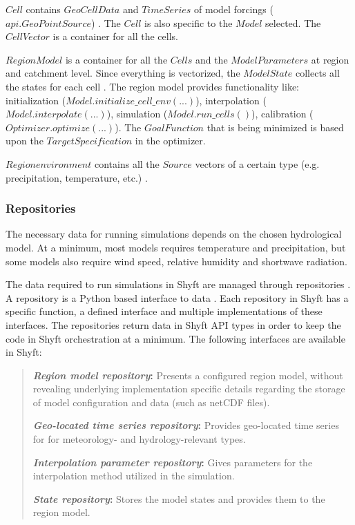$Cell$ contains $GeoCellData$ and $TimeSeries$ of model forcings ($api.GeoPointSource$) \autocite{burkhartShyftV4Framework2021}. The $Cell$ is also specific to the $Model$ selected. The $CellVector$ is a container for all the cells. 

$RegionModel$ is a container for all the $Cells$ and the $Model Parameters$ at region and catchment level. Since everything is vectorized, the $Model State$ collects all the states for each cell \autocite{burkhartShyftV4Framework2021}. The region model provides functionality like: initialization ($Model.initialize\_cell\_env(...)$), interpolation ($Model.interpolate(...)$), simulation ($Model.run\_cells()$), calibration ($Optimizer.optimize(...)$). The $GoalFunction$ that is being minimized is based upon the $TargetSpecification$ in the optimizer.

$Region environment$ contains all the $Source$ vectors of a certain type (e.g. precipitation, temperature, etc.) \autocite{burkhartShyftV4Framework2021}. 

\subsubsection{Repositories}

The necessary data for running simulations depends on the chosen hydrological model. At a minimum, most models requires temperature and precipitation, but some models also require wind speed, relative humidity and shortwave radiation. 

The data required to run simulations in Shyft are managed through repositories \autocite{fowlerPatternsEnterpriseApplication2003}. A repository is a Python based interface to data \autocite{masnunInterfacesPythonProtocols}. Each repository in Shyft has a specific function, a defined interface and multiple implementations of these interfaces. The repositories return data in Shyft API types in order to keep the code in Shyft orchestration at a minimum. The following interfaces are available in Shyft:

\begin{quote}
    \textbf{\textit{Region model repository}:} Presents a configured region model, without revealing underlying implementation specific details regarding the storage of model configuration and data (such as netCDF files).

    \textbf{\textit{Geo-located time series repository}:} Provides geo-located time series for for meteorology- and hydrology-relevant types.

    \textbf{\textit{Interpolation parameter repository}:} Gives parameters for the interpolation method utilized in the simulation.

    \textbf{\textit{State repository}:} Stores the model states and provides them to the region model.

\end{quote}

